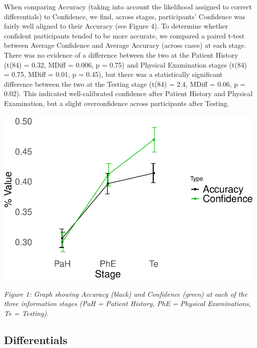 \documentclass[a4paper, nobind]{templates/ociamthesis}
\begin{document}
When comparing Accuracy (taking into account the likelihood assigned to correct differentials) to Confidence, we find, across stages, participants' Confidence was fairly well aligned to their Accuracy (see Figure 4). To determine whether confident participants tended to be more accurate, we compared a paired t-test between Average Confidence and Average Accuracy (across cases) at each stage. There was no evidence of a difference between the two at the Patient History (t(84) = 0.32, MDiff = 0.006, p = 0.75) and Physical Examination stages (t(84) = 0.75, MDiff = 0.01, p = 0.45), but there was a statistically significant difference between the two at the Testing stage (t(84) = 2.4, MDiff = 0.06, p = 0.02). This indicated well-calibrated confidence after Patient History and Physical Examination, but a slight overconfidence across participants after Testing.

\begin{center}\includegraphics[width=1\linewidth]{_main_files/figure-latex/meyerGraph-1} \end{center}

\emph{Figure 1: Graph showing Accuracy (black) and Confidence (green) at each of the three information stages (PaH = Patient History, PhE = Physical Examinations, Te = Testing).}

\subsection*{Differentials}\label{differentials}
\end{document}
